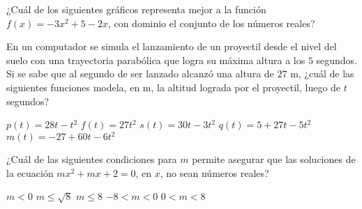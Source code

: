 \documentclass[
  titulo=Prueba,
  subtitulo=Álgebra y funciones,
  curso=Tercero medio A,
  fecha=2025-09-23,
  con nombre,
  ppp=1
]{srs3}
\begin{document}
\begin{preguntas}
\pregunta ¿Cuál de los siguientes gráficos representa mejor a la función \(f\left(x\right) = -3x^2 + 5 - 2x\), con dominio el conjunto de los números reales?
\begin{alternativas}[2]
\alternativa {}
\alternativa {}
\alternativa {}
\alternativa {}
\end{alternativas}

\pregunta En un computador se simula el lanzamiento de un proyectil desde el nivel del suelo con una trayectoria parabólica que logra su máxima altura a los \(5\) segundos. Si se sabe que al segundo de ser lanzado alcanzó una altura de \(27\) m, ¿cuál de las siguientes funciones modela, en m, la altitud lograda por el proyectil, luego de \(t\) segundos?
\begin{alternativas}
\alternativa \( p\left(t\right)=28t-t^2 \)
\alternativa \( f\left(t\right)=27t^2 \)
\alternativa \( s\left(t\right)=30t-3t^2 \)
\alternativa \( q\left(t\right)=5+27t-5t^2 \)
\alternativa \( m\left(t\right)=-27+60t-6t^2 \)
\end{alternativas}

\pregunta ¿Cuál de las siguientes condiciones para \(m\) permite asegurar que las soluciones de la ecuación \( mx^2+mx+2=0 \), en \(x\), no sean números reales?
\begin{alternativas}
\alternativa \( m < 0 \)
\alternativa \( m \leq \sqrt{8} \)
\alternativa \( m \leq 8 \)
\alternativa \( -8 < m < 0 \)
\alternativa \( 0 < m < 8 \)
\end{alternativas}


\end{preguntas}
\end{document}

